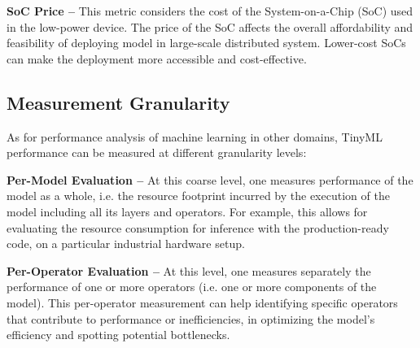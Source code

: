 {\bf SoC Price --}
This metric considers the cost of the System-on-a-Chip (SoC) used in the low-power device. The price of the SoC affects the overall affordability and feasibility of deploying model in large-scale distributed system. Lower-cost SoCs can make the deployment more accessible and cost-effective.

\subsection{Measurement Granularity}
As for performance analysis of machine learning in other domains, TinyML performance can be measured at different granularity levels:

{\bf Per-Model Evaluation --}
At this coarse level, one measures performance of the model as a whole, i.e. the resource footprint incurred by the execution of the model including all its layers and operators. For example, this allows for evaluating the resource consumption for inference with the production-ready code, on a particular industrial hardware setup.

{\bf Per-Operator Evaluation --}
At this level, one measures separately the performance of one or more operators (i.e. one or more components of the model). This per-operator measurement can help identifying specific operators that contribute to performance or inefficiencies, in optimizing the model's efficiency and spotting potential bottlenecks.

